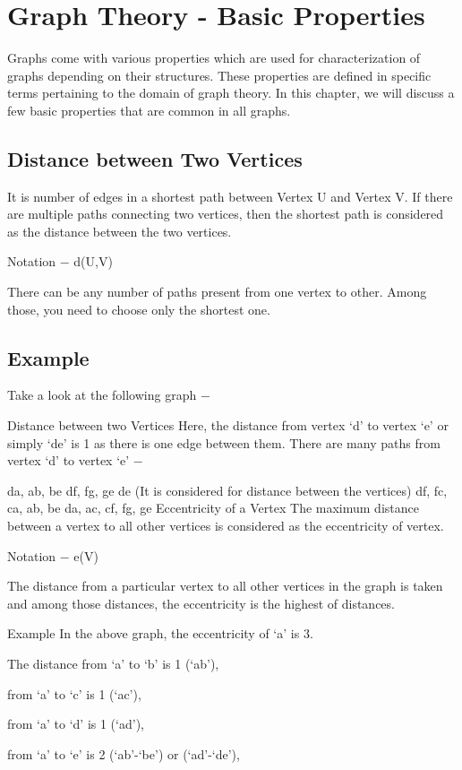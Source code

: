 \section{Graph Theory - Basic Properties}

 
Graphs come with various properties which are used for characterization of graphs depending on their structures. These properties are defined in specific terms pertaining to the domain of graph theory. In this chapter, we will discuss a few basic properties that are common in all graphs.

\subsection{Distance between Two Vertices}
It is number of edges in a shortest path between Vertex U and Vertex V. If there are multiple paths connecting two vertices, then the shortest path is considered as the distance between the two vertices.

Notation − d(U,V)

There can be any number of paths present from one vertex to other. Among those, you need to choose only the shortest one.

\subsection{Example}
Take a look at the following graph −

Distance between two Vertices
Here, the distance from vertex ‘d’ to vertex ‘e’ or simply ‘de’ is 1 as there is one edge between them. There are many paths from vertex ‘d’ to vertex ‘e’ −

da, ab, be
df, fg, ge
de (It is considered for distance between the vertices)
df, fc, ca, ab, be
da, ac, cf, fg, ge
Eccentricity of a Vertex
The maximum distance between a vertex to all other vertices is considered as the eccentricity of vertex.

Notation − e(V)

The distance from a particular vertex to all other vertices in the graph is taken and among those distances, the eccentricity is the highest of distances.

Example
In the above graph, the eccentricity of ‘a’ is 3.

The distance from ‘a’ to ‘b’ is 1 (‘ab’),

from ‘a’ to ‘c’ is 1 (‘ac’),

from ‘a’ to ‘d’ is 1 (‘ad’),

from ‘a’ to ‘e’ is 2 (‘ab’-‘be’) or (‘ad’-‘de’),

